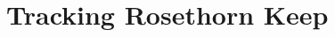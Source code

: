 \chapter{Tracking Rosethorn Keep}


\begin{figure}[h]%
	\subfloat{{ }}%
	\subfloat{{ }}%
\end{figure}

